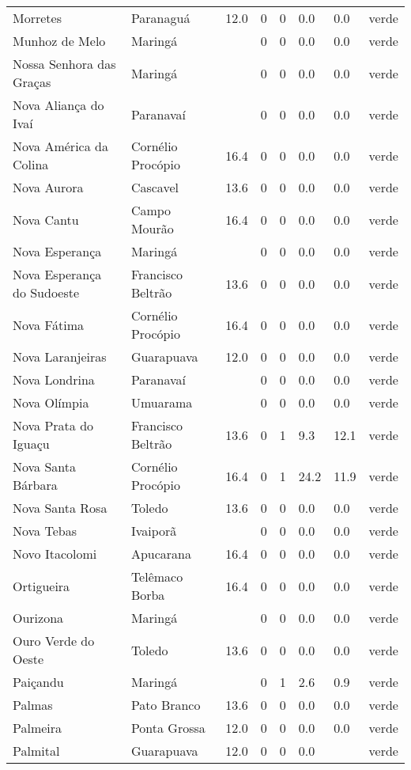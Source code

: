 \begin{longtable}{l|lllllll}
  Morretes & Paranaguá & 12.0 & 0 & 0 & 0.0 & 0.0 & verde \\ 
  Munhoz de Melo & Maringá &  & 0 & 0 & 0.0 & 0.0 & verde \\ 
  Nossa Senhora das Graças & Maringá &  & 0 & 0 & 0.0 & 0.0 & verde \\ 
  Nova Aliança do Ivaí & Paranavaí &  & 0 & 0 & 0.0 & 0.0 & verde \\ 
  Nova América da Colina & Cornélio Procópio & 16.4 & 0 & 0 & 0.0 & 0.0 & verde \\ 
  Nova Aurora & Cascavel & 13.6 & 0 & 0 & 0.0 & 0.0 & verde \\ 
  Nova Cantu & Campo Mourão & 16.4 & 0 & 0 & 0.0 & 0.0 & verde \\ 
  Nova Esperança & Maringá &  & 0 & 0 & 0.0 & 0.0 & verde \\ 
  Nova Esperança do Sudoeste & Francisco Beltrão & 13.6 & 0 & 0 & 0.0 & 0.0 & verde \\ 
  Nova Fátima & Cornélio Procópio & 16.4 & 0 & 0 & 0.0 & 0.0 & verde \\ 
  Nova Laranjeiras & Guarapuava & 12.0 & 0 & 0 & 0.0 & 0.0 & verde \\ 
  Nova Londrina & Paranavaí &  & 0 & 0 & 0.0 & 0.0 & verde \\ 
  Nova Olímpia & Umuarama &  & 0 & 0 & 0.0 & 0.0 & verde \\ 
  Nova Prata do Iguaçu & Francisco Beltrão & 13.6 & 0 & 1 & 9.3 & 12.1 & verde \\ 
  Nova Santa Bárbara & Cornélio Procópio & 16.4 & 0 & 1 & 24.2 & 11.9 & verde \\ 
  Nova Santa Rosa & Toledo & 13.6 & 0 & 0 & 0.0 & 0.0 & verde \\ 
  Nova Tebas & Ivaiporã &  & 0 & 0 & 0.0 & 0.0 & verde \\ 
  Novo Itacolomi & Apucarana & 16.4 & 0 & 0 & 0.0 & 0.0 & verde \\ 
  Ortigueira & Telêmaco Borba & 16.4 & 0 & 0 & 0.0 & 0.0 & verde \\ 
  Ourizona & Maringá &  & 0 & 0 & 0.0 & 0.0 & verde \\ 
  Ouro Verde do Oeste & Toledo & 13.6 & 0 & 0 & 0.0 & 0.0 & verde \\ 
  Paiçandu & Maringá &  & 0 & 1 & 2.6 & 0.9 & verde \\ 
  Palmas & Pato Branco & 13.6 & 0 & 0 & 0.0 & 0.0 & verde \\ 
  Palmeira & Ponta Grossa & 12.0 & 0 & 0 & 0.0 & 0.0 & verde \\ 
  Palmital & Guarapuava & 12.0 & 0 & 0 & 0.0 &  & verde \\ 

\end{longtable}
